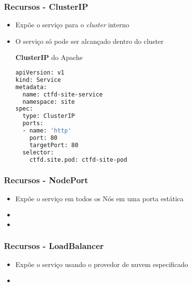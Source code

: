 \begin{frame}[containsverbatim]
\frametitle{Recursos - ClusterIP}
\begin{itemize}
	\item Expõe o serviço para o \textit{cluster} interno
	\item O serviço só pode ser alcançado dentro do cluster
\begin{center}
\begin{minipage}{0.9\textwidth}
\begin{block}{\textbf{ClusterIP} do Apache}
\scriptsize
\begin{lstlisting}[language=bash]
apiVersion: v1
kind: Service
metadata:
  name: ctfd-site-service
  namespace: site
spec:
  type: ClusterIP
  ports:
  - name: 'http'
    port: 80
    targetPort: 80
  selector:
    ctfd.site.pod: ctfd-site-pod
\end{lstlisting}
\end{block}
\end{minipage}
\end{center}
\end{itemize}
\end{frame}

\begin{frame}
\frametitle{Recursos - NodePort}
\begin{itemize}
	\item Expõe o serviço em todos os Nós em uma porta estática
	\item {}
	\item {}
\end{itemize}
\end{frame}

\begin{frame}
\frametitle{Recursos - LoadBalancer}
\begin{itemize}
	\item Expõe o serviço usando o provedor de nuvem especificado
	\item {}
\end{itemize}
\end{frame}

